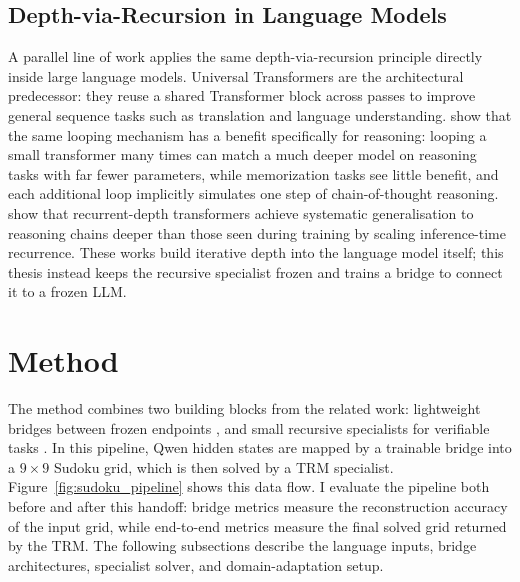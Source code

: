 \documentclass[11pt]{article}
\begin{document}
\subsection{Depth-via-Recursion in Language Models}
\label{sec:depth_recursion_llms}

A parallel line of work applies the same depth-via-recursion principle directly inside large language models.
Universal Transformers \cite{dehghaniUniversalTransformers2019} are the architectural predecessor: they reuse a shared Transformer block across passes to improve general sequence tasks such as translation and language understanding.
\citet{saunshiReasoningLatentThoughts2025} show that the same looping mechanism has a benefit specifically for reasoning: looping a small transformer many times can match a much deeper model on reasoning tasks with far fewer parameters, while memorization tasks see little benefit, and each additional loop implicitly simulates one step of chain-of-thought reasoning.
\citet{kohliLoopThinkGeneralize2026} show that recurrent-depth transformers achieve systematic generalisation to reasoning chains deeper than those seen during training by scaling inference-time recurrence.
These works build iterative depth into the language model itself; this thesis instead keeps the recursive specialist frozen and trains a bridge to connect it to a frozen LLM.

\section{Method}
\label{sec:method}

The method combines two building blocks from the related work: lightweight bridges between frozen endpoints \cite{liBLIP2BootstrappingLanguageImage2023,bounsiTransformersMeetNeural2024}, and small recursive specialists for verifiable tasks \cite{jolicoeur-martineauLessMoreRecursive2025}.
In this pipeline, Qwen hidden states are mapped by a trainable bridge into a $9{\times}9$ Sudoku grid, which is then solved by a TRM specialist.
Figure~\ref{fig:sudoku_pipeline} shows this data flow.
I evaluate the pipeline both before and after this handoff: bridge metrics measure the reconstruction accuracy of the input grid, while end-to-end metrics measure the final solved grid returned by the TRM.
The following subsections describe the language inputs, bridge architectures, specialist solver, and domain-adaptation setup.


\end{document}
